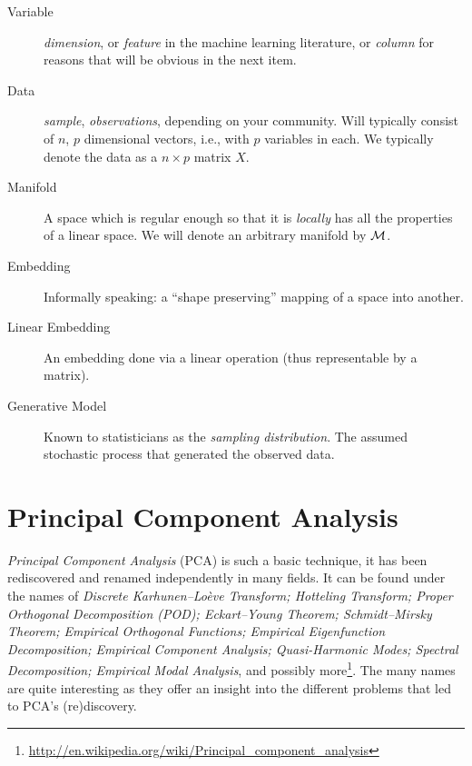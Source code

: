 \documentclass[12pt,a4paper]{article}
\begin{document}
\begin{tcolorbox}
\begin{description}
	
	\item[Variable] \Aka \emph{dimension}, or \emph{feature} in the machine learning literature, or \emph{column} for reasons that will be obvious in the next item. 
	
	\item[Data] \Aka \emph{sample}, \emph{observations}, depending on your community. 
	Will typically consist of $n$, $p$ dimensional vectors, i.e., with $p$ variables in each.
	We typically denote the data as a $n\times p$ matrix $X$. 
	
	\item[Manifold] A space which is regular enough so that it is \emph{locally} has all the properties of a linear space. 
	We will denote an arbitrary manifold by $\mathcal{M}$.
	
	
	\item[Embedding] Informally speaking: a ``shape preserving'' mapping of a space into another. 
	
	\item[Linear Embedding] An embedding done via a linear operation (thus representable by a matrix). 
	
	\item[Generative Model] Known to statisticians as the \emph{sampling distribution}. 
	The assumed stochastic process that generated the observed data. 
	
\end{description}
\end{tcolorbox}





\section{Principal Component Analysis}
\label{sec:pca}

\emph{Principal Component Analysis} (PCA) is such a basic technique, it has been rediscovered and renamed independently in many fields. 
It can be found under the names of 
\emph{
	Discrete Karhunen–Loève Transform; 
	Hotteling Transform; 
	Proper Orthogonal Decomposition (POD); 
	Eckart–Young Theorem; 
	Schmidt–Mirsky Theorem;  
	Empirical Orthogonal Functions; 
	Empirical Eigenfunction Decomposition;  
	Empirical Component Analysis;  
	Quasi-Harmonic Modes;  
	Spectral Decomposition;  
	Empirical Modal Analysis}, 
and possibly more\footnote{\url{http://en.wikipedia.org/wiki/Principal_component_analysis} }.
The many names are quite interesting as they offer an insight into the different problems that led to PCA's (re)discovery.
\end{document}
